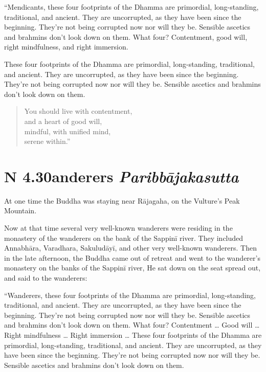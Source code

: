 \documentclass[12pt,openany]{book}%
\newcommand*{\suttatitleacronym}[1]{\smaller[2]{#1}\vspace*{.3em}}
\newcommand*{\suttatitletranslation}[1]{\linebreak{#1}}
\newcommand*{\suttatitleroot}[1]{\linebreak\smaller[2]\itshape{#1}}
\newcommand*{\tocacronym}[1]{\hspace*{-3.3em}{#1}\quad}
\newcommand*{\toctranslation}[1]{#1}
\newcommand*{\tocroot}[1]{(\textit{#1})}
\begin{document}
“Mendicants, these four footprints of the Dhamma are primordial, long-standing, traditional, and ancient. They are uncorrupted, as they have been since the beginning. They’re not being corrupted now nor will they be. Sensible ascetics and brahmins don’t look down on them. What four? Contentment, good will, right mindfulness, and right immersion. 

These four footprints of the Dhamma are primordial, long-standing, traditional, and ancient. They are uncorrupted, as they have been since the beginning. They’re not being corrupted now nor will they be. Sensible ascetics and brahmins don’t look down on them. 

\begin{verse}%
You should live with contentment, \\
and a heart of good will, \\
mindful, with unified mind, \\
serene within.” 

%
\end{verse}

%
\section*{{\suttatitleacronym AN 4.30}{\suttatitletranslation Wanderers }{\suttatitleroot Paribbājakasutta}}
\addcontentsline{toc}{section}{\tocacronym{AN 4.30} \toctranslation{Wanderers } \tocroot{Paribbājakasutta}}

At one time the Buddha was staying near \textsanskrit{Rājagaha}, on the Vulture’s Peak Mountain. 

Now at that time several very well-known wanderers were residing in the monastery of the wanderers on the bank of the \textsanskrit{Sappinī} river. They included \textsanskrit{Annabhāra}, Varadhara, \textsanskrit{Sakuludāyī}, and other very well-known wanderers. Then in the late afternoon, the Buddha came out of retreat and went to the wanderer’s monastery on the banks of the \textsanskrit{Sappinī} river, He sat down on the seat spread out, and said to the wanderers: 

“Wanderers, these four footprints of the Dhamma are primordial, long-standing, traditional, and ancient. They are uncorrupted, as they have been since the beginning. They’re not being corrupted now nor will they be. Sensible ascetics and brahmins don’t look down on them. What four? Contentment … Good will … Right mindfulness … Right immersion … These four footprints of the Dhamma are primordial, long-standing, traditional, and ancient. They are uncorrupted, as they have been since the beginning. They’re not being corrupted now nor will they be. Sensible ascetics and brahmins don’t look down on them. 
\end{document}
